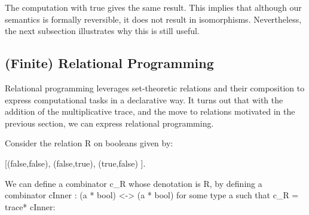 \documentclass{llncs}
\begin{document}
\noindent  The computation with {{true}} gives the same result.  This
implies that although our semantics is formally reversible, it 
does not result in isomorphisms.
Nevertheless, the next subsection illustrates why this is still useful.

\subsection{(Finite) Relational Programming}
\label{ch3:sec:lp}

Relational programming leverages set-theoretic relations and their
composition to express computational tasks in a declarative way. 
It turns out that with the addition of the multiplicative trace, and
the move to relations motivated in the previous section, we can
express relational programming.

Consider the relation {{R}} on booleans given by:

{{ {[(false,false), (false,true), (true,false) ]}. }}

\noindent We can define a combinator {{c_R}} whose denotation is {{R}},
by defining a combinator {{cInner : (a * bool) <-> (a * bool)}}
for some type {{a}} such that {{c_R = trace* cInner}}:

\end{document}
